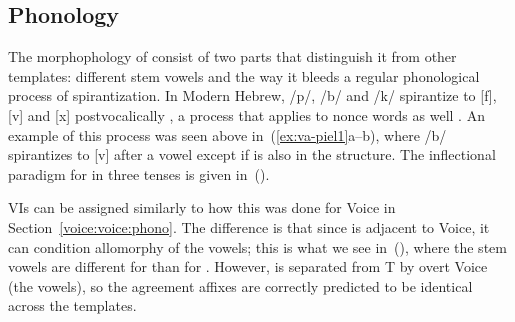 {	\subsection{Phonology} \label{voice:va:phono}
The morphophology of {\tpie} consist of two parts that distinguish it from other templates: different stem vowels and the way it bleeds a regular phonological process of spirantization. In Modern Hebrew, /p/, /b/ and /k/ spirantize to [f], [v] and [x] postvocalically \citep{adam02,temkinmartinez08wccfl,gouskova12nllt}, a process that applies to nonce words as well \citep{temkinmartinzemuellner16}. An example of this process was seen above in~(\ref{ex:va-piel1}a--b), where /b/ spirantizes to [v] after a vowel except if {\va} is also in the structure. The inflectional paradigm for {\tpie} in three tenses is given in~(\nextx).

\ex
{}
\xe

VIs can be assigned similarly to how this was done for Voice in Section~\ref{voice:voice:phono}. The difference is that since {\va} is adjacent to Voice, it can condition allomorphy of the vowels; this is what we see in~(\lastx), where the stem vowels are different for {\tpie} than for {\tkal}. However, {\tpie} is separated from T by overt Voice (the vowels), so the agreement affixes are correctly predicted to be identical across the templates.

}
